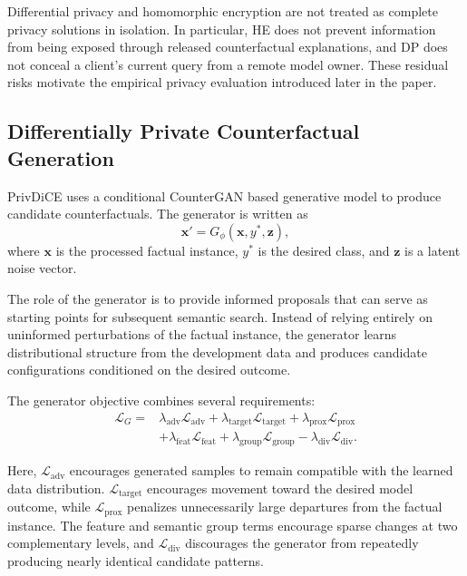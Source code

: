 \documentclass[preprint,12pt]{elsarticle}
\begin{document}
Differential privacy and homomorphic encryption are not treated as complete
privacy solutions in isolation. In particular, HE does not prevent information
from being exposed through released counterfactual explanations, and DP does
not conceal a client's current query from a remote model owner. These residual
risks motivate the empirical privacy evaluation introduced later in the paper.


\subsection{Differentially Private Counterfactual Generation}
\label{subsec:dp_generator}

PrivDiCE uses a conditional CounterGAN based generative model to produce
candidate counterfactuals. The generator is written as
\begin{equation}
\mathbf{x}' =
G_{\phi}(\mathbf{x},y^{*},\mathbf{z}),
\label{eq:generator}
\end{equation}
where $\mathbf{x}$ is the processed factual instance, $y^{*}$ is the desired
class, and $\mathbf{z}$ is a latent noise vector.

The role of the generator is to provide informed proposals that can serve as
starting points for subsequent semantic search. Instead of relying entirely on
uninformed perturbations of the factual instance, the generator learns
distributional structure from the development data and produces candidate
configurations conditioned on the desired outcome.

The generator objective combines several requirements:
\begin{equation}
\begin{split}
\mathcal{L}_{G}
={}&
\lambda_{\mathrm{adv}}\mathcal{L}_{\mathrm{adv}}
+
\lambda_{\mathrm{target}}\mathcal{L}_{\mathrm{target}}
+
\lambda_{\mathrm{prox}}\mathcal{L}_{\mathrm{prox}}
\\
&+
\lambda_{\mathrm{feat}}\mathcal{L}_{\mathrm{feat}}
+
\lambda_{\mathrm{group}}\mathcal{L}_{\mathrm{group}}
-
\lambda_{\mathrm{div}}\mathcal{L}_{\mathrm{div}}.
\end{split}
\label{eq:generator_objective}
\end{equation}

Here, $\mathcal{L}_{\mathrm{adv}}$ encourages generated samples to remain
compatible with the learned data distribution.
$\mathcal{L}_{\mathrm{target}}$ encourages movement toward the desired model
outcome, while $\mathcal{L}_{\mathrm{prox}}$ penalizes unnecessarily large
departures from the factual instance. The feature and semantic group terms
encourage sparse changes at two complementary levels, and
$\mathcal{L}_{\mathrm{div}}$ discourages the generator from repeatedly
producing nearly identical candidate patterns.
\end{document}
